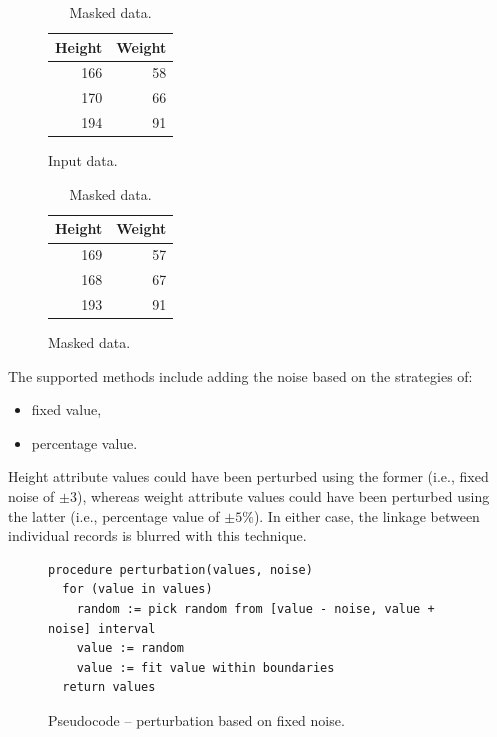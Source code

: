\documentclass[a4paper,twoside,12pt]{book}
\begin{document}
\begin{table}
\centering
\caption{Perturbation.}
\begin{subfigure}{.4\textwidth}
\centering
\caption{Input data.}
\label{id:tab:perturbation_raw}
\begin{tabular}{rr}
\toprule
Height & Weight \\ \midrule
166                        & 58                         \\
170                        & 66                         \\
194                        & 91                        \\ \bottomrule
\end{tabular}
\end{subfigure}
\begin{subfigure}{.4\textwidth}
\centering
\caption{Masked data.}
\label{id:tab:perturbation}
\begin{tabular}{rr}
\toprule
Height & Weight \\ \midrule
169                        & 57                         \\
168                        & 67                         \\
193                        & 91                        \\ \bottomrule
\end{tabular}
\end{subfigure}
\end{table}
%
The supported methods include adding the noise based on the strategies of:
\begin{itemize}
\item fixed value,
\item percentage value.
\end{itemize}
%
Height attribute values could have been perturbed using the former (i.e., fixed noise of $\pm 3$), whereas weight attribute values could have been perturbed using the latter (i.e., percentage value of $\pm 5 \%$). In either case, the linkage between individual records is blurred with this technique. 
%
\begin{figure}%
\begin{verbatim}
procedure perturbation(values, noise)
  for (value in values)
    random := pick random from [value - noise, value + noise] interval
    value := random
    value := fit value within boundaries
  return values
\end{verbatim}
\caption{Pseudocode – perturbation based on fixed noise.}
\label{fig:code:perturbation_fixed}
\end{figure}
\end{document}
